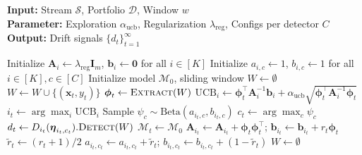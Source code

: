 \documentclass{article}
\begin{document}
\begin{algorithm}[!htb]
\caption{AutoDD Algorithm}
\label{alg:autodd}
\textbf{Input:} Stream $\mathcal{S}$, Portfolio $\mathcal{D}$, Window $w$\\
\textbf{Parameter:} Exploration $\alpha_{\text{ucb}}$, Regularization $\lambda_{\text{reg}}$, Configs per detector $C$\\
\textbf{Output:} Drift signals $\{d_t\}_{t=1}^\infty$
\begin{algorithmic}[1]
\STATE Initialize $\mathbf{A}_i \gets \lambda_{\text{reg}}\mathbf{I}_m$, $\mathbf{b}_i \gets \mathbf{0}$ for all $i \in [K]$
\STATE Initialize $a_{i,c} \gets 1$, $b_{i,c} \gets 1$ for all $i \in [K], c \in [C]$
\STATE Initialize model $\mathcal{M}_0$, sliding window $W \gets \emptyset$
    \STATE $W \gets W \cup \{(\mathbf{x}_t, y_t)\}$
        \STATE $\boldsymbol{\phi}_t \gets \textsc{Extract}(W)$ 
            \STATE $\text{UCB}_i \gets \boldsymbol{\phi}_t^\top \mathbf{A}_i^{-1} \mathbf{b}_i + \alpha_{\text{ucb}} \sqrt{\boldsymbol{\phi}_t^\top \mathbf{A}_i^{-1} \boldsymbol{\phi}_t}$
        \ENDFOR
        \STATE $i_t \gets \arg\max_i \text{UCB}_i$ 
            \STATE Sample $\psi_c \sim \text{Beta}(a_{i_t,c}, b_{i_t,c})$
        \ENDFOR
        \STATE $c_t \gets \arg\max_c \psi_c$ 
        \STATE $d_t \gets D_{i_t}(\boldsymbol{\eta}_{i_t,c_t}).\textsc{Detect}(W)$
            \STATE $\mathcal{M}_t \gets \mathcal{M}_0$ %
        \ENDIF
        \STATE {}
        \STATE $\mathbf{A}_{i_t} \gets \mathbf{A}_{i_t} + \boldsymbol{\phi}_t \boldsymbol{\phi}_t^\top$; $\mathbf{b}_{i_t} \gets \mathbf{b}_{i_t} + r_t \boldsymbol{\phi}_t$
        \STATE $\tilde{r}_t \gets (r_t + 1)/2$
        \STATE $a_{i_t,c_t} \gets a_{i_t,c_t} + \tilde{r}_t$; $b_{i_t,c_t} \gets b_{i_t,c_t} + (1-\tilde{r}_t)$
        \STATE $W \gets \emptyset$
    \ENDIF
\ENDFOR
\end{algorithmic}
\end{algorithm}
\end{document}

